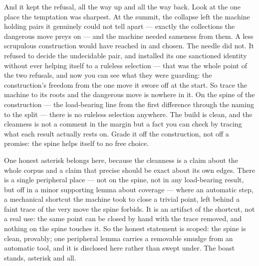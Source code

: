 And it kept the refusal, all the way up and all the way back. Look at the one place the temptation was sharpest.
At the summit, the collapse left the machine holding pairs it genuinely could not tell apart --- exactly the
collections the dangerous move preys on --- and the machine needed sameness from them. A less scrupulous
construction would have reached in and chosen. The needle did not. It refused to decide the undecidable pair, and
installed its one sanctioned identity without ever helping itself to a ruleless selection --- that was the whole
point of the two refusals, and now you can see what they were guarding: the construction's freedom from the one
move it swore off at the start. So trace the machine to its roots and the dangerous move is nowhere in it. On the
spine of the construction --- the load-bearing line from the first difference through the naming to the split ---
there is no ruleless selection anywhere. The build is clean, and the cleanness is not a comment in the margin but
a fact you can check by tracing what each result actually rests on. Grade it off the construction, not off a
promise: the spine helps itself to no free choice.

One honest asterisk belongs here, because the cleanness is a claim about the whole corpus and a claim that precise
should be exact about its own edges. There is a single peripheral place --- not on the spine, not in any
load-bearing result, but off in a minor supporting lemma about coverage --- where an automatic step, a mechanical
shortcut the machine took to close a trivial point, left behind a faint trace of the very move the spine forbids.
It is an artifact of the shortcut, not a real use: the same point can be closed by hand with the trace removed,
and nothing on the spine touches it. So the honest statement is scoped: the spine is clean, provably; one
peripheral lemma carries a removable smudge from an automatic tool, and it is disclosed here rather than swept
under. The boast stands, asterisk and all.

